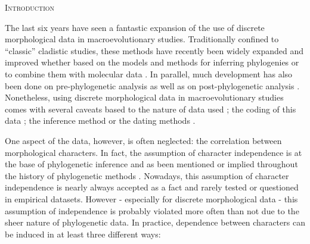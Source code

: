 \documentclass[12pt,letterpaper]{article}
\renewcommand{\section}[1]{%
\bigskip
\begin{center}
\begin{Large}
\normalfont\scshape #1
\medskip
\end{Large}
\end{center}}
\begin{document}
\section{Introduction}

The last six years have seen a fantastic expansion of the use of discrete morphological data in macroevolutionary studies.
Traditionally confined to ``classic'' cladistic studies, these methods have recently been widely expanded and improved whether based on the models and methods for inferring phylogenies \citep[e.g.][]{heath2014fossilized,Wright01072016} or to combine them with molecular data \citep[e.g.][]{pyrondivergence2011,ronquista2012}.
In parallel, much development has also been done on pre-phylogenetic analysis \citep[e.g. data collection;][]{morphobank} as well as on post-phylogenetic analysis \citep[e.g. morphological disparity analysis;][]{Close2015,Claddis}.
Nonetheless, using discrete morphological data in macroevolutionary studies comes with several caveats based to the nature of data used \citep{Guillerme2016146,bapst2017combined}; the coding of this data \citep{Brazeau2011,simoes2017giant}; the inference method \citep{spencerefficacy2013,wrightbayesian2014,OReilly20160081,puttick2017uncertain,goloboff2017weighted} or the dating methods \citep{Arcila2015131,o2016tips}.

One aspect of the data, however, is often neglected: the correlation between morphological characters.
In fact, the assumption of character independence is at the base of phylogenetic inference and as been mentioned or implied throughout the history of phylogenetic methods \citep[e.g.][]{joysey1982problems,felsenstein1985phylogenies,lewisa2001,felsenstein2004inferring}.
Nowadays, this assumption of character independence is nearly always accepted as a fact and rarely tested or questioned in empirical datasets.
However - especially for discrete morphological data - this assumption of independence is probably violated more often than not due to the sheer nature of phylogenetic data.
In practice, dependence between characters can be induced in at least three different ways:
\end{document}
